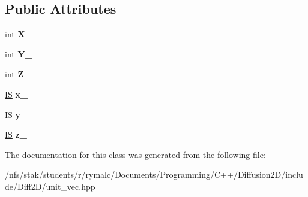\subsection*{Public Attributes}
\begin{DoxyCompactItemize}
\item 
\hypertarget{classLocalCoor_a7d72e3489aaf1b6579f7a3e0f5b30e26}{
int {\bfseries X\_\-}}
\label{classLocalCoor_a7d72e3489aaf1b6579f7a3e0f5b30e26}

\item 
\hypertarget{classLocalCoor_a5ff6668d5d6898582ddfdc5eadce58ff}{
int {\bfseries Y\_\-}}
\label{classLocalCoor_a5ff6668d5d6898582ddfdc5eadce58ff}

\item 
\hypertarget{classLocalCoor_acd97c2eb7e3b994dbc58ae98ab785280}{
int {\bfseries Z\_\-}}
\label{classLocalCoor_acd97c2eb7e3b994dbc58ae98ab785280}

\item 
\hypertarget{classLocalCoor_a2c0e974fc45c597f893b20a0c2f6869c}{
\hyperlink{structIS}{IS} {\bfseries x\_\-}}
\label{classLocalCoor_a2c0e974fc45c597f893b20a0c2f6869c}

\item 
\hypertarget{classLocalCoor_a58678d9cfb17db349a9d7fd70a2d5150}{
\hyperlink{structIS}{IS} {\bfseries y\_\-}}
\label{classLocalCoor_a58678d9cfb17db349a9d7fd70a2d5150}

\item 
\hypertarget{classLocalCoor_acdd6d24c450a43fd755f2e43d16d9991}{
\hyperlink{structIS}{IS} {\bfseries z\_\-}}
\label{classLocalCoor_acdd6d24c450a43fd755f2e43d16d9991}

\end{DoxyCompactItemize}


The documentation for this class was generated from the following file:\begin{DoxyCompactItemize}
\item 
/nfs/stak/students/r/rymalc/Documents/Programming/C++/Diffusion2D/include/Diff2D/unit\_\-vec.hpp\end{DoxyCompactItemize}
